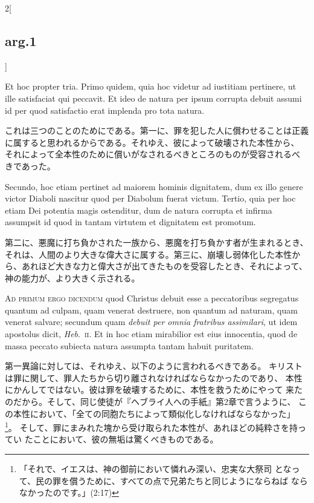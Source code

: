\documentclass[paper=a4paper,fontsize=10pt,jafontsize=9pt,titlepage]{jlreq}
\begin{document}
\begin{paracol}{2}[\subsection{arg.1}]
\switchcolumn*

Et hoc propter tria. Primo quidem, quia hoc videtur
ad iustitiam pertinere, ut ille satisfaciat qui peccavit. Et ideo de
natura per ipsum corrupta debuit assumi id per quod satisfactio erat
implenda pro tota natura.

\switchcolumn

これは三つのことのためにである。第一に、罪を犯した人に償わせることは正義
 に属すると思われるからである。それゆえ、彼によって破壊された本性から、
 それによって全本性のために償いがなされるべきところのものが受容されるべ
 きであった。

\switchcolumn*

Secundo, hoc etiam pertinet ad maiorem hominis
dignitatem, dum ex illo genere victor Diaboli nascitur quod per Diabolum
fuerat victum. Tertio, quia per hoc etiam Dei potentia magis ostenditur,
dum de natura corrupta et infirma assumpsit id quod in tantam virtutem
et dignitatem est promotum.

\switchcolumn

第二に、悪魔に打ち負かされた一族から、悪魔を打ち負かす者が生まれるとき、
 それは、人間のより大きな偉大さに属する。第三に、崩壊し弱体化した本性か
 ら、あれほど大きな力と偉大さが出てきたものを受容したとき、それによって、
 神の能力が、より大きく示される。

\switchcolumn*[\subsection{ad.1}]

{\scshape Ad primum ergo dicendum} quod Christus debuit esse a peccatoribus
segregatus quantum ad culpam, quam venerat destruere, non quantum ad
naturam, quam venerat salvare; secundum quam {\itshape debuit per omnia fratribus
assimilari}, ut idem apostolus dicit, {\itshape Heb}.~{\scshape ii}. Et in hoc etiam mirabilior
est eius innocentia, quod de massa peccato subiecta natura assumpta
tantam habuit puritatem.

\switchcolumn

第一異論に対しては、それゆえ、以下のように言われるべきである。
キリストは罪に関して、罪人たちから切り離されなければならなかったのであり、
 本性にかんしてではない。彼は罪を破壊するために、本性を救うためにやって
 来たのだから。そして、同じ使徒が『ヘブライ人への手紙』第2章で言うように、
 この本性において、「全ての同胞たちによって類似化しなければならなかった」
 \footnote{「それで、イエスは、神の御前において憐れみ深い、忠実な大祭司
 となって、民の罪を償うために、すべての点で兄弟たちと同じようにならねば
 ならなかったのです。」(2:17)}。
そして、罪にまみれた塊から受け取られた本性が、あれほどの純粋さを持ってい
 たことにおいて、彼の無垢は驚くべきものである。


\end{paracol}
\end{document}
